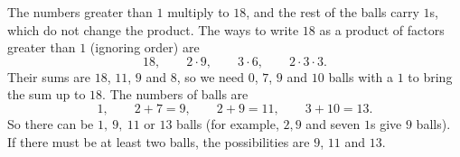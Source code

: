 The numbers greater than $1$ multiply to $18$, and the rest of the balls carry $1$s, which do not change the product. The ways to write $18$ as a product of factors greater than $1$ (ignoring order) are
\[
18,\qquad 2\cdot9,\qquad 3\cdot6,\qquad 2\cdot3\cdot3 .
\]
Their sums are $18$, $11$, $9$ and $8$, so we need $0$, $7$, $9$ and $10$ balls with a $1$ to bring the sum up to $18$. The numbers of balls are
\[
1,\qquad 2+7=9,\qquad 2+9=11,\qquad 3+10=13 .
\]
So there can be $\boxed{1,\ 9,\ 11\text{ or }13}$ balls (for example, $2,9$ and seven $1$s give $9$ balls). If there must be at least two balls, the possibilities are $9$, $11$ and $13$.

